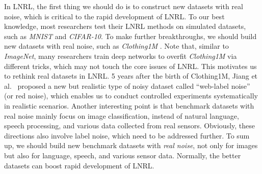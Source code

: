 In LNRL, the first thing we should do is to construct new datasets with real noise, which is critical to the rapid development of LNRL. To our best knowledge, 
most  researchers test their LNRL methods on simulated datasets, 
such as \textit{MNIST} and \textit{CIFAR-10}. To make further breakthroughs, we should build  new datasets with real noise, 
such as \textit{Clothing1M} .
Note that, 
similar to \textit{ImageNet}, 
many researchers train deep networks to overfit \textit{Clothing1M} via different tricks, 
which may not touch the core issues of LNRL.
This motivates us to rethink real datasets in LNRL. 5 years after the birth of Clothing1M, Jiang et al.~ proposed a new but realistic type of noisy dataset called ``web-label noise'' (or red noise), which enables us to conduct controlled experiments systematically in realistic scenarios. Another interesting point is that benchmark datasets with real noise mainly focus on image classification, instead of natural language, speech processing, and various data collected from real sensors. Obviously, these directions also involve label noise, which need to be addressed further.
To sum up, we should build  new benchmark datasets with \textit{real noise}, not only for images but also for language, speech, and various sensor data. Normally, the better datasets can boost  rapid development of LNRL.

